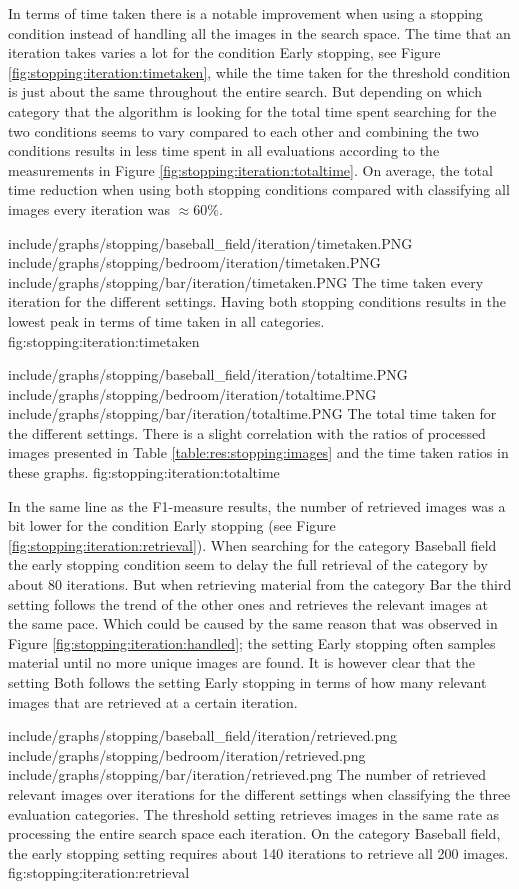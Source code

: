 In terms of time taken there is a notable improvement when using a stopping condition instead of handling all the images in the search space. The time that an iteration takes varies a lot for the condition Early stopping, see Figure \ref{fig:stopping:iteration:timetaken}, while the time taken for the threshold condition is just about the same throughout the entire search. But depending on which category that the algorithm is looking for the total time spent searching for the two conditions seems to vary compared to each other and combining the two conditions results in less time spent in all evaluations according to the measurements in Figure \ref{fig:stopping:iteration:totaltime}. On average, the total time reduction when using both stopping conditions compared with classifying all images every iteration was $\approx60\%$. 

\tripfigurenear
{include/graphs/stopping/baseball_field/iteration/timetaken.PNG}
{include/graphs/stopping/bedroom/iteration/timetaken.PNG}
{include/graphs/stopping/bar/iteration/timetaken.PNG}
{The time taken every iteration for the different settings. Having both stopping conditions results in the lowest peak in terms of time taken in all categories.}
{fig:stopping:iteration:timetaken}

\tripfigurenear
{include/graphs/stopping/baseball_field/iteration/totaltime.PNG}
{include/graphs/stopping/bedroom/iteration/totaltime.PNG}
{include/graphs/stopping/bar/iteration/totaltime.PNG}
{The total time taken for the different settings. There is a slight correlation with the ratios of processed images presented in Table \ref{table:res:stopping:images} and the time taken ratios in these graphs.}
{fig:stopping:iteration:totaltime}

In the same line as the F1-measure results, the number of retrieved images was a bit lower for the condition Early stopping (see Figure \ref{fig:stopping:iteration:retrieval}). 
When searching for the category Baseball field the early stopping condition seem to delay the full retrieval of the category by about 80 iterations. But when retrieving material from the category Bar the third setting follows the trend of the other ones and retrieves the relevant images at the same pace. Which could be caused by the same reason that was observed in Figure \ref{fig:stopping:iteration:handled}; the setting Early stopping often samples material until no more unique images are found. It is however clear that the setting Both follows the setting Early stopping in terms of how many relevant images that are retrieved at a certain iteration. 


\tripfigure
{include/graphs/stopping/baseball_field/iteration/retrieved.png}
{include/graphs/stopping/bedroom/iteration/retrieved.png}
{include/graphs/stopping/bar/iteration/retrieved.png}
{The number of retrieved relevant images over iterations for the different settings when classifying the three evaluation categories. The threshold setting retrieves images in the same rate as processing the entire search space each iteration. On the category Baseball field, the early stopping setting requires about 140 iterations to retrieve all 200 images.}
{fig:stopping:iteration:retrieval}
